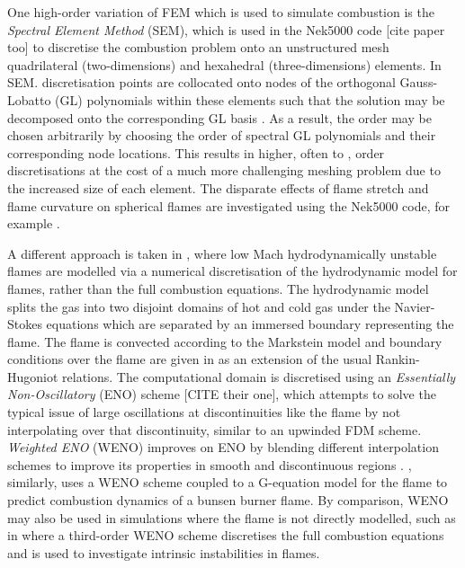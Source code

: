 One high-order variation of FEM which is used to simulate combustion is the \emph{Spectral Element Method} (SEM), which is used in the Nek5000 code \cite{nek1996NEK5000} [cite paper too] to discretise the combustion problem onto an unstructured mesh quadrilateral (two-dimensions) and hexahedral (three-dimensions) elements. In SEM. discretisation points are collocated onto nodes of the orthogonal Gauss-Lobatto (GL) polynomials within these elements such that the solution may be decomposed onto the corresponding GL basis \cite{patera1984SpectralElementMethod}. As a result, the order may be chosen arbitrarily by choosing the order of spectral GL polynomials and their corresponding node locations. This results in higher, often  to , order discretisations at the cost of a much more challenging meshing problem due to the increased size of each element. The disparate effects of flame stretch and flame curvature on spherical flames are investigated using the Nek5000 code, for example \cite{giannakopoulos2015CurvatureMarksteinLength}.

A different approach is taken in \cite{krishnan2025NumericalMethodMultidimensional, patyal2018NonlinearDevelopmentHydrodynamicallyUnstable, creta2011StrainRateEffects}, where low Mach hydrodynamically unstable flames are modelled via a numerical discretisation of the hydrodynamic model for flames, rather than the full combustion equations. The hydrodynamic model \cite{matalon1982FlamesGasdynamicDiscontinuities,clavin1982EffectsMolecularDiffusion} splits the gas into two disjoint domains of hot and cold gas under the Navier-Stokes equations which are separated by an immersed boundary representing the flame. The flame is convected according to the Markstein model and boundary conditions over the flame are given in \cite{matalon1982FlamesGasdynamicDiscontinuities,clavin1982EffectsMolecularDiffusion} as an extension of the usual Rankin-Hugoniot relations. The computational domain is discretised using an \emph{Essentially Non-Oscillatory} (ENO) scheme [CITE their one], which attempts to solve the typical issue of large oscillations at discontinuities like the flame by not interpolating over that discontinuity, similar to an upwinded FDM scheme. \emph{Weighted ENO} (WENO) improves on ENO by blending different interpolation schemes to improve its properties in smooth and discontinuous regions \cite{bozorgpour2025RecentAdvancementsFluid}. \cite{schuller2002ModelingToolsPrediction}, similarly, uses a WENO scheme coupled to a G-equation model for the flame to predict combustion dynamics of a bunsen burner flame. By comparison, WENO may also be used in simulations where the flame is not directly modelled, such as in \cite{berger2022IntrinsicInstabilitiesPremixed} where a third-order WENO scheme discretises the full combustion equations and is used to investigate intrinsic instabilities in flames.

